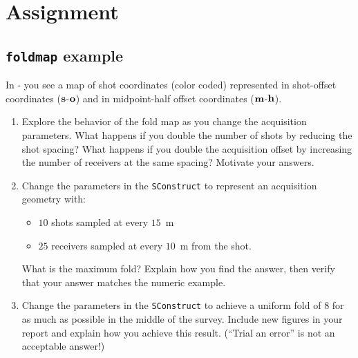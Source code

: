\section{Assignment}

\subsection{\texttt{foldmap} example}


In - you see a map of shot coordinates (color coded) represented in shot-offset coordinates ($\ss$-$\oo$) and in midpoint-half offset coordinates ($\mm$-$\ho$).
\begin{enumerate}
\item Explore the behavior of the fold map as you change the acquisition parameters. What happens if you double the number of shots by reducing the shot spacing? What happens if you double the acquisition offset by increasing the number of receivers at the same spacing? Motivate your answers.
\item Change the parameters in the \texttt{SConstruct} to represent an acquisition geometry with:
\begin{itemize}
\item $10$ shots sampled at every $15$~m
\item $25$ receivers sampled at every $10$~m from the shot.
\end{itemize}
What is the maximum fold? Explain how you find the answer, then verify that your answer matches the numeric example. 
\item Change the parameters in the \texttt{SConstruct} to achieve a uniform fold of $8$ for as much as possible in the middle of the  survey. Include new figures in your report and explain how you achieve this result. (``Trial an error'' is not an acceptable answer!)
\end{enumerate}

